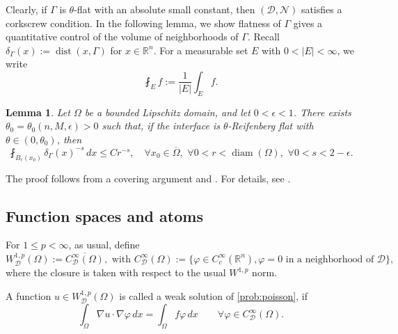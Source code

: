 \documentclass[12pt]{amsart}
\newtheorem{lemma}[theorem]{Lemma}
\numberwithin{equation}{section}
\newcommand{\bR}{\mathbb{R}}
\newcommand\cD{\mathcal{D}}
\newcommand\cN{\mathcal{N}}
\newcommand\dist{\operatorname{dist}}
\begin{document}
Clearly, if $\Gamma$ is $\theta$-flat with an absolute small constant, then $(\cD, \cN)$ satisfies a corkscrew condition. 
In the following lemma, we show flatness of $\Gamma$ gives a quantitative control of the volume of neighborhoods of $\Gamma$. Recall $\delta_\Gamma(x):=\dist(x,\Gamma)$ for $x\in\bR^n$. For a measurable set $E$ with $0<|E|<\infty$, we write
$$
 \fint_E f:=\frac{1}{|E|}\int_E f.
$$
\begin{lemma} \label{lem-codim2-vol}
Let $\Omega$ be a bounded Lipschitz domain, and let $0<\epsilon<1$. There exists $\theta_0=\theta_0(n,M,\epsilon)>0$ such that, if the interface is $\theta$-Reifenberg flat with $\theta \in (0, \theta_0)$, then
\begin{equation}
  \fint_{B_r(x_0)}\delta_\Gamma(x)^{-s}\,dx\leq Cr^{-s},
  \quad
  \forall x_0 \in \overline{\Omega},\,\,\forall 0<r<\operatorname{diam}(\Omega), \,\,\forall 0<s<2-\epsilon.
  \label{eqn-260819-1032}
\end{equation}
\end{lemma}

The proof follows from a covering argument and \cite[Lemma~2.5]{MR3034453}. For details, see \cite[proof of Lemma~5.1]{MR4232502}.



\subsection{Function spaces and atoms} \label{sec-160831-0602}
For $1\leq p<\infty$, as usual, define 
\begin{equation*}
    W_{\cD}^{1,p}(\Omega) :=\overline{C_\cD^\infty(\Omega)},
    \,\,\text{with}\,\,
    C_\cD^\infty(\Omega):= \{\varphi \in C^\infty_c(\bR^n), \varphi=0\,\,\text{in a neighborhood of}\,\,\cD\},
\end{equation*}
where the closure is taken with respect to the usual $W^{1,p}$ norm. 

A function $u\in W^{1,p}_{\cD}(\Omega)$ is called a weak solution of \eqref{prob:poisson}, if
\begin{equation}
  \int_\Omega\nabla u\cdot\nabla\varphi\, dx
  =\int_\Omega f\varphi\, dx
  \qquad
  \forall\varphi\in C_{\cD}^\infty(\Omega).
  \label{eq:poisson-weak}
\end{equation}
\end{document}
